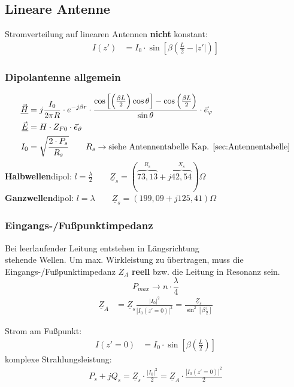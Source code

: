 \subsection{Lineare Antenne}
Stromverteilung auf linearen Antennen \textbf{nicht} konstant:
\begin{align*}
    I(z') & = I_0\cdot\sin\left[\beta\left(\frac{L}{2}-|z'|\right)\right]
\end{align*}

\subsubsection{Dipolantenne allgemein}
\begin{align*}
    \vec{\underline{H}}      & = j\frac{I_0}{2\pi R}\cdot e^{-j\beta r}\cdot\frac{\cos\left[\left(\frac{\beta L}{2}\right)\cos\theta\right]-\cos\left(\frac{\beta L}{2}\right)}{\sin\theta}\cdot\vec{e}_\varphi         \\
    \vec{\underline{E}}      & = H\cdot Z_{F0}\cdot\vec{e}_\vartheta                          \\
    I_0          & = \sqrt{\frac{2\cdot P_{s}}{R_{s}}} \qquad R_{s} \rightarrow \text{siehe Antennentabelle Kap. \ref{sec:Antennentabelle}}                                
\end{align*}
\textbf{Halbwellen}dipol: $ l=\frac{\lambda}{2} \qquad \underline{Z}_{s}=(\overbrace{73,13}^{R_s}+j\overbrace{42,54}^{X_s})\Omega$\\
\textbf{Ganzwellen}dipol: $ l=\lambda \qquad \underline{Z}_{s}=(199,09+j125,41)\Omega$

\subsubsection{Eingangs-/Fußpunktimpedanz}
Bei leerlaufender Leitung entstehen in Längsrichtung\\ stehende Wellen. Um max. Wirkleistung zu übertragen, muss die Eingangs-/Fußpunktimpedanz $ Z_A $ \textbf{reell} bzw. die Leitung in Resonanz sein.	
\begin{equation*}
	P_{max} \rightarrow n \cdot \frac{\lambda}{4}
\end{equation*}
\begin{align*}
	\underline{Z}_A&=\underline{Z}_s\frac{|I_0|^2}{|I_0(z'=0)|^2} = \frac{\underline{Z}_s}{\sin^2\left[ \beta \frac{l}{2} \right] }
\end{align*}

Strom am Fußpunkt:
\begin{align*}
	I(z'=0) & = I_0\cdot\sin\left[\beta\left(\frac{L}{2}\right)\right]
\end{align*}
komplexe Strahlungsleistung:
\begin{align*}
	P_s +jQ_s = \underline{Z}_s\cdot \frac{|I_0|^2}{2} = \underline{Z}_A \cdot \frac{|I_0(z'=0)|^2}{2}
\end{align*}
